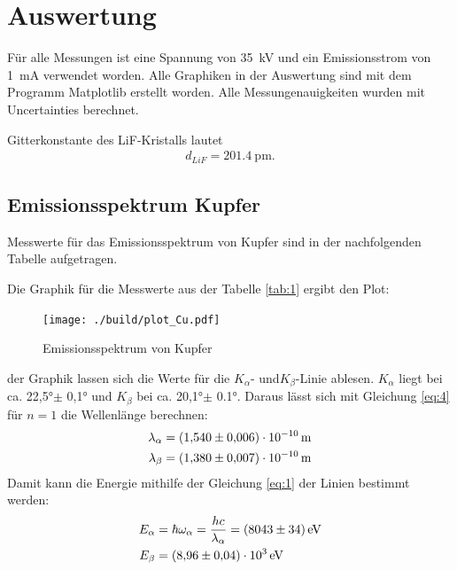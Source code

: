 
\section{Auswertung}

Für alle Messungen ist eine Spannung von \SI{35}{\kilo\volt} und ein
Emissionsstrom von \SI{1}{\milli\ampere} verwendet worden.
Alle Graphiken in der Auswertung sind mit dem Programm
Matplotlib \cite{matplotlib} erstellt worden.
Alle Messungenauigkeiten wurden mit Uncertainties \cite{uncertainties} berechnet.

 Gitterkonstante des LiF-Kristalls lautet \cite{V603}
\begin{align}
    d_{LiF}=\SI{201,4}{\pico\meter} \label{eq:5}.
\end{align}

\subsection{Emissionsspektrum Kupfer}

\justifying Messwerte für das Emissionsspektrum von Kupfer sind in der nachfolgenden Tabelle 
aufgetragen.







Die Graphik für die Messwerte aus der Tabelle \ref{tab:1} ergibt den Plot:
\begin{figure}[H]
    \centering
    \texttt{[image: ./build/plot\_Cu.pdf]}
    \caption{Emissionsspektrum von Kupfer \cite{matplotlib}}
    \label{fig:3}
\end{figure}

\justifying der Graphik lassen sich die Werte für die $K_{\alpha}$- und$K_{\beta}$-Linie
ablesen. $K_{\alpha}$ liegt bei ca. 22,5°$\pm$ 0,1° und $K_{\beta}$ bei ca. 20,1°$\pm$ 0.1°.
Daraus lässt sich mit Gleichung \eqref{eq:4} für $n=1$ die Wellenlänge berechnen:
\begin{align}
    \lambda _{\alpha}&= \SI{1,54+-0,006e-10}{\meter} \label{eq:6}\\
    \lambda_{\beta}&= \SI{1,38+-0,007e-10}{\meter} \label{eq:7}
\end{align}
Damit kann die Energie mithilfe der Gleichung \eqref{eq:1} der Linien bestimmt werden:
\begin{subequations}
\begin{align}
    E_{\alpha}&= \hbar \omega _{\alpha} = \frac{h c}{\lambda _{\alpha}}=\SI{8043+-34}{\electronvolt}  \label{eq:8a} \\
    E_{\beta}&= \SI{8,96+-0.04e03}{\electronvolt} \label{eq:8b}
\end{align}
\end{subequations}


